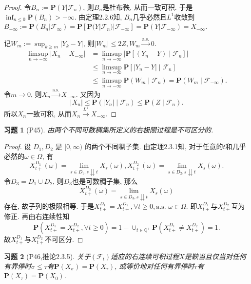 \documentclass[UTF8,ondside]{ctexart}
\newtheorem{exercise}{习题}[section]
\newcommand{\h}{\mathscr}
\newcommand{\kx}{\mathbb}
\newcommand{\mbf}{\mathbf}
\numberwithin{equation}{section}
\begin{document}
	\begin{proof}
		令$B_n:=\mbf P(Y|\h F_n)$, 则$B_n$是杜布鞅, 从而一致可积. 于是$\inf_{n\leq 0}\mbf P(B_n)>-\infty$. 由定理2.2.6知, $B_n$几乎必然且$L^1$收敛到$B_{-\infty}:=\mbf P(B_n|\h F_\infty)=\mbf P[\mbf P(Y|\h F_n)|\h F_{-\infty}]=\mbf P(Y|\h F_{-\infty})=X_{-\infty}$.
		
		记$W_m:=\sup_{k\geq m}|Y_k-Y|$, 则$|W_m|\leq 2Z, W_m\xrightarrow{\text{a.s.}}0.$
		\[\begin{aligned}
			\limsup_{n\rightarrow -\infty}|X_n-X_{-\infty}|&=\limsup_{n\rightarrow -\infty}\left|\mbf P[(Y_n-Y)\mid\h F_n]\right|\\
			&\leq \limsup_{n\rightarrow -\infty}\mbf P[|Y_n-Y|\mid\h F_n]\\
			&\leq \limsup_{n\rightarrow -\infty}\mbf P(W_m\mid\h F_n)=\mbf P(W_m\mid\h F_{-\infty}).
		\end{aligned}\]
		令$m\rightarrow 0$, 则$X_n\xrightarrow{\text{a.s.}}X_{-\infty}$. 又因为
		\[
			|X_n|\leq \mbf P(|Y_n|\mid\h F_n)\leq \mbf P(Z\mid\h F_n).	
		\]
		所以$X_n$一致可积, 从而$X_n\xrightarrow{L^1}X_{-\infty}$.
	\end{proof}
	\begin{exercise}[P45]
		由两个不同可数稠集所定义的右极限过程是不可区分的.
	\end{exercise}
	\begin{proof}
		设 $D_1,D_2$ 是 $[0,\infty)$ 的两个不同稠子集. 由定理2.3.1知, 对于任意的$t$和几乎必然的$\omega\in\Omega$, 有
		\[
			X_{t+}^{D_1}(\omega)=\lim_{s\in D_1,s\downdownarrows t}X_s(\omega),
			X_{t+}^{D_2}(\omega)=\lim_{s\in D_2,s\downdownarrows t}X_s(\omega).
		\]
		令$D_3=D_1\cup D_2$, 则$D_3$也是可数稠子集, 那么
		\[
			X_{t+}^{D_3}(\omega)=\lim_{s\in D_3,s\downdownarrows t}X_s(\omega)
		\]
		存在, 故子列的极限相等. 于是$X_{t+}^{D_1}=X_{t+}^{D_2},\forall t\geq 0,\text{a.s. }\omega\in\Omega$. 即$X_{t+}^{D_1}$与$X_{t+}^{D_2}$互为修正. 再由右连续性知
		\[
			\mbf P(X_{t+}^{D_1}=X_{t+}^{D_2},\forall t\geq 0)=1-\cup_{t\in \kx Q^{+}}\mbf P(X_{t+}^{D_1}\neq X_{t+}^{D_2})=1.
		\]
		故$X_{t+}^{D_1}$与$X_{t+}^{D_2}$不可区分.
	\end{proof}
	\begin{exercise}[P46,推论2.3.5]
		关于$(\h F_t)$适应的右连续可积过程$X$是鞅当且仅当对任何有界停时$\sigma\leq\tau$有$\mbf P(X_\sigma)=\mbf P(X_\tau)$, 或等价地对任何有界停时$\tau$有$\mbf P(X_\tau)=\mbf P(X_0)$.
	\end{exercise}
\end{document}
